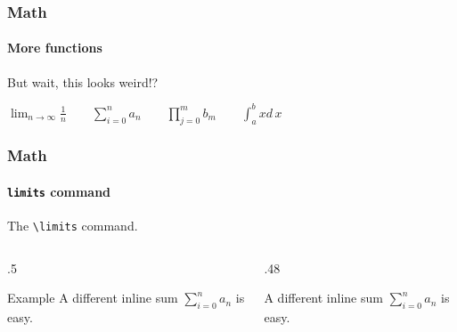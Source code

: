 \begin{frame}
    \frametitle{Math}
    \framesubtitle{More functions}
    \begin{center}
        \Large%
        But wait, this looks weird!?

        \vfill
        $\lim_{n \to \infty} \frac{1}{n}
        \qquad
        \sum_{i = 0}^{n} a_n
        \qquad
        \prod_{j = 0}^{m}b_m
        \qquad
        \int_{a}^{b} x d\,x$

        \vfill
    \end{center}
\end{frame}

\begin{frame}[fragile]
    \frametitle{Math}
    \framesubtitle{\texttt{\bslash limits} command}
    \begin{center}
        \Large%
        The \lstinline|\limits| command.
    \end{center}
    \begin{columns}
        \begin{column}{.5\textwidth}
            \begin{exlisting}{Example}
A different inline sum
$\sum\limits_{i = 0}^{n} a_n$
is easy.    
            \end{exlisting}
        \end{column}
        \begin{column}{.48\textwidth}
            \centering
            \vspace{1em}
            
            A different inline sum
            $\sum\limits_{i = 0}^{n} a_n$
            is easy.
        \end{column}
    \end{columns}
\end{frame}

